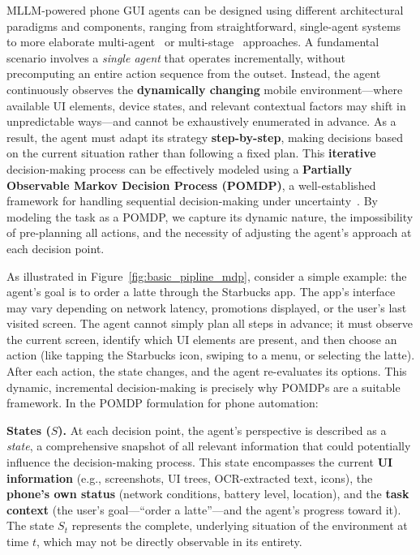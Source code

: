 MLLM-powered phone GUI agents can be designed using different architectural paradigms and components, ranging from straightforward, single-agent systems~\cite{wang2023enabling,wen2023droidbot,wen2024autodroid,zhang2023appagent,wang2024mobileagentv1} to more elaborate multi-agent~\cite{wang2024mobileagentv2,zhang2024mobileexperts,zhang2024dynamic} or multi-stage~\cite{zheng2024gpt,gou2024navigating,hoscilowicz2024clickagent} approaches. A fundamental scenario involves a \textit{single agent} that operates incrementally, without precomputing an entire action sequence from the outset. Instead, the agent continuously observes the \textbf{dynamically changing} mobile environment—where available UI elements, device states, and relevant contextual factors may shift in unpredictable ways—and cannot be exhaustively enumerated in advance. As a result, the agent must adapt its strategy \textbf{step-by-step}, making decisions based on the current situation rather than following a fixed plan. This \textbf{iterative} decision-making process can be effectively modeled using a \textbf{Partially Observable Markov Decision Process (POMDP)}, a well-established framework for handling sequential decision-making under uncertainty~\cite{monahan1982state,spaan2012partially}. By modeling the task as a POMDP, we capture its dynamic nature, the impossibility of pre-planning all actions, and the necessity of adjusting the agent’s approach at each decision point.

As illustrated in Figure~\ref{fig:basic_pipline_mdp}, consider a simple example: the agent’s goal is to order a latte through the Starbucks app. The app’s interface may vary depending on network latency, promotions displayed, or the user’s last visited screen. The agent cannot simply plan all steps in advance; it must observe the current screen, identify which UI elements are present, and then choose an action (like tapping the Starbucks icon, swiping to a menu, or selecting the latte). After each action, the state changes, and the agent re-evaluates its options. This dynamic, incremental decision-making is precisely why POMDPs are a suitable framework. In the POMDP formulation for phone automation:



\noindent\textbf{States ($S$).}
At each decision point, the agent’s perspective is described as a \textit{state}, a comprehensive snapshot of all relevant information that could potentially influence the decision-making process. This state encompasses the current \textbf{UI information} (e.g., screenshots, UI trees, OCR-extracted text, icons), the \textbf{phone’s own status} (network conditions, battery level, location), and the \textbf{task context} (the user’s goal—“order a latte”—and the agent’s progress toward it). The state $S_t$ represents the complete, underlying situation of the environment at time $t$, which may not be directly observable in its entirety.


